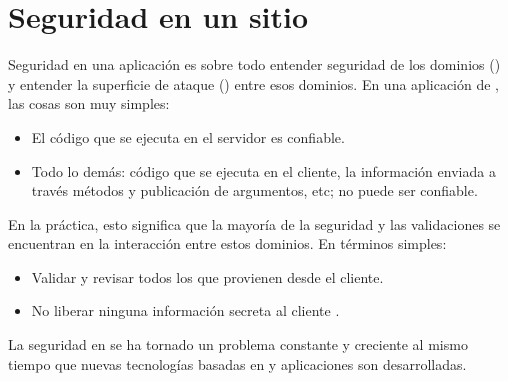 
\section{Seguridad en un sitio \ecommerceCOM}\label{cap:seguridad}


	Seguridad en una aplicación \webINT es sobre todo entender seguridad de los dominios (\securityDomainCPT) y entender la superficie de ataque (\attackSurfaceCPT) entre esos dominios. En una aplicación de \meteorNAME, las cosas son muy simples:

	\begin{itemize}
			\item
				El código que se ejecuta en el servidor es confiable.
			\item
				Todo lo demás: código que se ejecuta en el cliente, la información enviada a través métodos y publicación de argumentos, etc; no puede ser confiable.
	\end{itemize}
	En la práctica, esto significa que la mayoría de la seguridad y las validaciones se encuentran en la interacción entre estos dominios. En términos simples:
	\begin{itemize}
			\item
				Validar y revisar todos los  que provienen desde el cliente.
			\item
				No liberar ninguna información secreta al cliente \cite{online_meteor_security}.
	\end{itemize}



	La seguridad en \internetINT se ha tornado un problema constante y creciente al mismo tiempo que nuevas tecnologías basadas en \internetINT y aplicaciones son desarrolladas.



